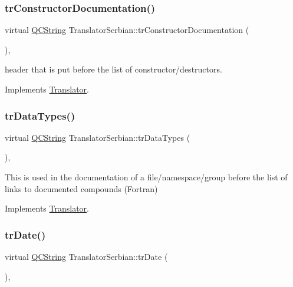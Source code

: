 \subsubsection{\texorpdfstring{trConstructorDocumentation()}{trConstructorDocumentation()}}
{\footnotesize\ttfamily virtual \mbox{\hyperlink{class_q_c_string}{Q\+C\+String}} Translator\+Serbian\+::tr\+Constructor\+Documentation (\begin{DoxyParamCaption}{ }\end{DoxyParamCaption})\hspace{0.3cm}{\ttfamily [inline]}, {\ttfamily [virtual]}}

header that is put before the list of constructor/destructors. 

Implements \mbox{\hyperlink{class_translator}{Translator}}.

\mbox{\label{class_translator_serbian_aa26a1b2fb7bb6d7aceaf47038a46013f}} 
\subsubsection{\texorpdfstring{trDataTypes()}{trDataTypes()}}
{\footnotesize\ttfamily virtual \mbox{\hyperlink{class_q_c_string}{Q\+C\+String}} Translator\+Serbian\+::tr\+Data\+Types (\begin{DoxyParamCaption}{ }\end{DoxyParamCaption})\hspace{0.3cm}{\ttfamily [inline]}, {\ttfamily [virtual]}}

This is used in the documentation of a file/namespace/group before the list of links to documented compounds (Fortran) 

Implements \mbox{\hyperlink{class_translator}{Translator}}.

\mbox{\label{class_translator_serbian_a746ddc2882e6384640fdbb38587d966c}} 
\subsubsection{\texorpdfstring{trDate()}{trDate()}}
{\footnotesize\ttfamily virtual \mbox{\hyperlink{class_q_c_string}{Q\+C\+String}} Translator\+Serbian\+::tr\+Date (\begin{DoxyParamCaption}{ }\end{DoxyParamCaption})\hspace{0.3cm}{\ttfamily [inline]}, {\ttfamily [virtual]}}

